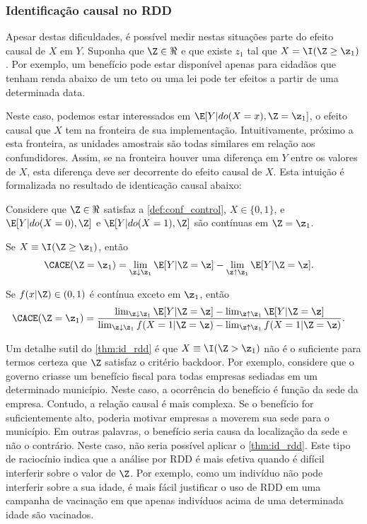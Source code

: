 \subsubsection{Identificação causal no RDD}

Apesar destas dificuldades,
é possível medir nestas situações
parte do efeito causal de $X$ em $Y$.
Suponha que $\Z \in \Re$ e que 
existe $z_1$ tal que $X = \I(\Z \geq \z_1)$. 
Por exemplo, um benefício pode estar disponível
apenas para cidadãos que tenham renda 
abaixo de um teto ou
uma lei pode ter efeitos
a partir de uma determinada data.

Neste caso, podemos estar interessados em
$\E[Y|do(X=x),\Z=\z_1]$, 
o efeito causal que $X$ tem na 
fronteira de sua implementação.
Intuitivamente, próximo a esta fronteira,
as unidades amostrais são todas similares 
em relação aos confundidores.
Assim, se na fronteira houver uma diferença em $Y$ entre
os valores de $X$, esta diferença 
deve ser decorrente do efeito causal de $X$.
Esta intuição é formalizada no resultado de
identicação causal abaixo:

\begin{theorem}
 \label{thm:id_rdd}
 Considere que $\Z \in \Re$ satisfaz 
 a \cref{def:conf_control}, $X \in \{0,1\}$, e
 $\E[Y|do(X=0),\Z]$ e $\E[Y|do(X=1),\Z]$ são 
 contínuas em $\Z=\z_1$.
 
 Se $X \equiv \I(\Z \geq \z_1)$, então
 \begin{align*}
  \CACE(\Z=\z_1)
  &= \lim_{\z \downarrow \z_1} \E[Y|\Z = \z] 
  - \lim_{\z \uparrow \z_1} \E[Y|\Z = \z].
 \end{align*}
 
 Se $f(x|\Z) \in (0,1)$ é contínua exceto em $\z_1$, então
 \begin{align*}
  \CACE(\Z=\z_1)
  &= \frac{\lim_{\z \downarrow \z_1} \E[Y|\Z = \z] 
  - \lim_{\z \uparrow \z_1} \E[Y|\Z = \z]}
  {\lim_{\z \downarrow \z_1} f(X=1|\Z=\z) 
  - \lim_{\z \uparrow \z_1} f(X=1|\Z=\z)}.
 \end{align*}
\end{theorem}

Um detalhe sutil do \cref{thm:id_rdd} é que
$X \equiv \I(\Z > \z_1)$ não é
o suficiente para termos certeza que
$\Z$ satisfaz o critério backdoor.
Por exemplo, considere que 
o governo criasse um benefício fiscal para
todas empresas sediadas em um determinado município.
Neste caso, a ocorrência do benefício é
função da sede da empresa. 
Contudo, a relação causal é mais complexa.
Se o benefício for suficientemente alto,
poderia motivar empresas a 
moverem sua sede para o município.
Em outras palavras, 
o benefício seria causa da localização da sede e não o contrário.
Neste caso, não seria possível aplicar o \cref{thm:id_rdd}.
Este tipo de raciocínio indica que a análise por RDD é
mais efetiva quando é difícil interferir sobre o valor de $\Z$.
Por exemplo, como um indivíduo não pode interferir sobre a sua idade,
é mais fácil justificar o uso de RDD em
uma campanha de vacinação em que
apenas indivíduos acima de uma determinada idade são vacinados.

